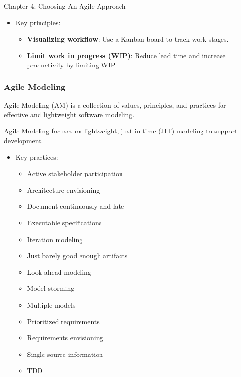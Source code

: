 \begin{notes}{Chapter 4: Choosing An Agile Approach}
\begin{highlight}
        \begin{itemize}
            \item Key principles:
            \begin{itemize}
                \item \textbf{Visualizing workflow}: Use a Kanban board to track work stages.
                \item \textbf{Limit work in progress (WIP)}: Reduce lead time and increase productivity by limiting WIP.
            \end{itemize}
        \end{itemize}
    
    \end{highlight}
    
    \subsubsection*{Agile Modeling}
    
    Agile Modeling (AM) is a collection of values, principles, and practices for effective and lightweight software modeling.
    
    \begin{highlight}
    
        Agile Modeling focuses on lightweight, just-in-time (JIT) modeling to support development.
        
        \begin{itemize}
            \item Key practices:
            \begin{itemize}
                \item Active stakeholder participation
                \item Architecture envisioning
                \item Document continuously and late
                \item Executable specifications
                \item Iteration modeling
                \item Just barely good enough artifacts
                \item Look-ahead modeling
                \item Model storming
                \item Multiple models
                \item Prioritized requirements
                \item Requirements envisioning
                \item Single-source information
                \item TDD
            \end{itemize}
        \end{itemize}
    

\end{highlight}
\end{notes}
